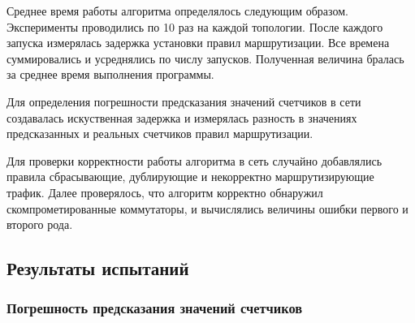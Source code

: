 \documentclass[../thesis.tex]{subfiles}
\begin{document}
Среднее время работы алгоритма определялось следующим образом.
Эксперименты проводились по 10 раз на каждой топологии.
После каждого запуска измерялась задержка установки правил маршрутизации.
Все времена суммировались и усреднялись по числу запусков.
Полученная величина бралась за среднее время выполнения программы.

Для определения погрешности предсказания значений счетчиков в сети создавалась искуственная задержка и измерялась разность в значениях предсказанных и реальных счетчиков правил маршрутизации.

Для проверки корректности работы алгоритма в сеть случайно добавлялись правила сбрасывающие, дублирующие и некорректно маршрутизирующие трафик.
Далее проверялось, что алгоритм корректно обнаружил скомпрометированные коммутаторы, и вычислялись величины ошибки первого и второго рода.

\subsection{Результаты испытаний}

\subsubsection{Погрешность предсказания значений счетчиков}
\end{document}
